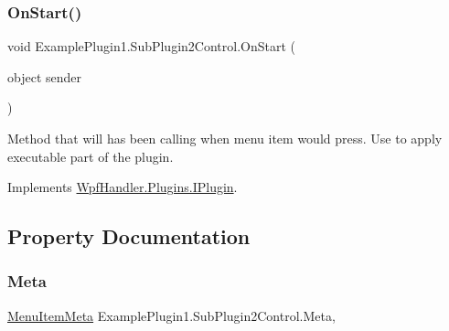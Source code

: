 \mbox{\label{class_example_plugin1_1_1_sub_plugin2_control_ac44073957fa6c64503888c57d6d5d471}} 
\subsubsection{\texorpdfstring{On\+Start()}{OnStart()}\hspace{0.1cm}{\footnotesize\ttfamily [2/2]}}
{\footnotesize\ttfamily void Example\+Plugin1.\+Sub\+Plugin2\+Control.\+On\+Start (\begin{DoxyParamCaption}\item[{object}]{sender }\end{DoxyParamCaption})}



Method that will has been calling when menu item would press. Use to apply executable part of the plugin. 



Implements \mbox{\hyperlink{interface_wpf_handler_1_1_plugins_1_1_i_plugin_aabe1a8e5680ebeb37f96ffe86b6123e9}{Wpf\+Handler.\+Plugins.\+I\+Plugin}}.



\subsection{Property Documentation}
\mbox{\label{class_example_plugin1_1_1_sub_plugin2_control_a460641929919e54605759a4541bbbbe1}} 
\subsubsection{\texorpdfstring{Meta}{Meta}}
{\footnotesize\ttfamily \mbox{\hyperlink{class_wpf_handler_1_1_plugins_1_1_menu_item_meta}{Menu\+Item\+Meta}} Example\+Plugin1.\+Sub\+Plugin2\+Control.\+Meta\hspace{0.3cm}{\ttfamily [get]}, {\ttfamily [set]}}

